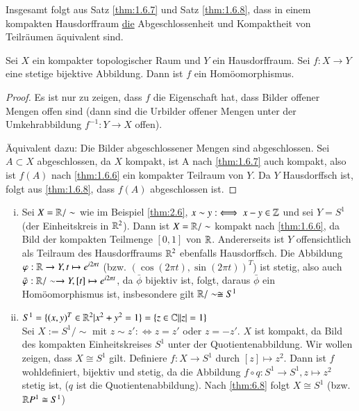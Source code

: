 \documentclass[a4paper,10pt]{scrartcl}
\newcommand{\homo}{\cong}
\begin{document}
Insgesamt folgt aus Satz \ref{thm:1.6.7} und Satz \ref{thm:1.6.8}, dass in einem kompakten Hausdorffraum \underline{die} Abgeschlossenheit und Kompaktheit von Teilräumen äquivalent sind.
\begin{st}\label{thm:6.8}
 Sei $X$ ein kompakter topologischer Raum und $Y$ ein Hausdorffraum. Sei $f: X\to Y$ eine stetige bijektive Abbildung. Dann ist $f$ ein Homöomorphismus.
\end{st}
\begin{proof}
 Es ist nur zu zeigen, dass $f$ die Eigenschaft hat, dass Bilder offener Mengen offen sind (dann sind die Urbilder offener Mengen unter der Umkehrabbildung $f^{-1}:Y\to X$ offen).

Äquivalent dazu: Die Bilder abgeschlossener Mengen sind abgeschlossen. Sei $A\subset X$ abgeschlossen, da $X$ kompakt, ist A nach \ref{thm:1.6.7} auch kompakt, also ist $f(A)$ nach  \ref{thm:1.6.6}  ein kompakter Teilraum von $Y$. Da $Y$ Hausdorffsch ist, folgt aus \ref{thm:1.6.8}, dass $f(A)$ abgeschlossen ist.
\end{proof}
\begin{ex*}
 \begin{enumerate}[(i)]
  \item Sei $X=\mathbb{R}/\sim$ wie im Beispiel \ref{thm:2.6}, $x\sim y:\iff x-y\in \mathbb{Z}$ und sei $Y=S^1$ (der Einheitskreis in $\mathbb{R}^2$). Dann ist $X=\mathbb{R}/\sim$ kompakt nach \ref{thm:1.6.6}, da Bild der kompakten Teilmenge $[0,1]$ von $\mathbb{R}$. Andererseits ist $Y$ offensichtlich als Teilraum des Hausdorffraums $\mathbb{R}^2$ ebenfalls Hausdorffsch. Die Abbildung $\varphi: \mathbb{R}\to Y, t\mapsto e^{i2\pi t}$ (bzw. $(\cos(2\pi t), \sin(2\pi t))^T$) ist stetig, also auch $\bar {\varphi}: \mathbb{R}/\sim \to Y, [t]\mapsto e^{i2\pi t}$, da $\bar \phi$ bijektiv ist, folgt, daraus $\bar \phi$ ein Homöomorphismus ist, insbesondere gilt $\R/\sim \homo S^1$

 \item $S^1=\{(x,y)^T\in \mathbb{R}^2|x^2+y^2=1\}=\{z\in \mathbb{C}||z|=1\}$\\

 Sei $X:=S^1/\sim$ mit $z\sim z':\iff z=z'$ oder $z=-z'$. $X$ ist kompakt, da Bild des kompakten Einheitskreises $S^1$ unter der Quotientenabbildung. Wir wollen zeigen, dass $X\homo S^{1}$ gilt. Definiere $f:X\to S^1$ durch $[z]\mapsto z^2$. Dann ist $f$ wohldefiniert, bijektiv und stetig, da die Abbildung $ f \circ q : S^1 \to S^1, z \mapsto z^2 $ stetig
ist, ($q$ ist die Quotientenabbildung). Nach \ref{thm:6.8} folgt $X\homo S^1$ (bzw. $\R P^1\homo S^1$)
\end{enumerate}
\end{ex*}
\end{document}
